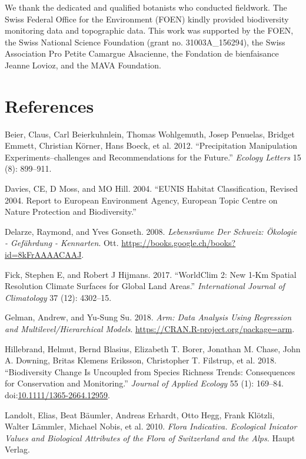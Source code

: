 \documentclass[fleqn,10pt,lineno]{wlpeerj} %
\theoremstyle{definition}
\theoremstyle{definition}
\theoremstyle{definition}
\theoremstyle{remark}
\begin{document}
We thank the dedicated and qualified botanists who conducted fieldwork.
The Swiss Federal Office for the Environment (FOEN) kindly provided
biodiversity monitoring data and topographic data. This work was
supported by the FOEN, the Swiss National Science Foundation (grant no.
31003A\_156294), the Swiss Association Pro Petite Camargue Alsacienne,
the Fondation de bienfaisance Jeanne Lovioz, and the MAVA Foundation.

\section*{References}\label{references}

\hypertarget{refs}{}
\hypertarget{ref-Beier2012}{}
Beier, Claus, Carl Beierkuhnlein, Thomas Wohlgemuth, Josep Penuelas,
Bridget Emmett, Christian Körner, Hans Boeck, et al. 2012.
``Precipitation Manipulation Experiments--challenges and Recommendations
for the Future.'' \emph{Ecology Letters} 15 (8): 899--911.

\hypertarget{ref-Davies2004}{}
Davies, CE, D Moss, and MO Hill. 2004. ``EUNIS Habitat Classification,
Revised 2004. Report to European Environment Agency, European Topic
Centre on Nature Protection and Biodiversity.''

\hypertarget{ref-Delarze2008}{}
Delarze, Raymond, and Yves Gonseth. 2008. \emph{Lebensräume Der Schweiz:
Ökologie - Gefährdung - Kennarten}. Ott.
\url{https://books.google.ch/books?id=8kFrAAAACAAJ}.

\hypertarget{ref-Fick2017}{}
Fick, Stephen E, and Robert J Hijmans. 2017. ``WorldClim 2: New 1-Km
Spatial Resolution Climate Surfaces for Global Land Areas.''
\emph{International Journal of Climatology} 37 (12): 4302--15.

\hypertarget{ref-arm2018}{}
Gelman, Andrew, and Yu-Sung Su. 2018. \emph{Arm: Data Analysis Using
Regression and Multilevel/Hierarchical Models}.
\url{https://CRAN.R-project.org/package=arm}.

\hypertarget{ref-Hillebrand2018}{}
Hillebrand, Helmut, Bernd Blasius, Elizabeth T. Borer, Jonathan M.
Chase, John A. Downing, Britas Klemens Eriksson, Christopher T.
Filstrup, et al. 2018. ``Biodiversity Change Is Uncoupled from Species
Richness Trends: Consequences for Conservation and Monitoring.''
\emph{Journal of Applied Ecology} 55 (1): 169--84.
doi:\href{https://doi.org/10.1111/1365-2664.12959}{10.1111/1365-2664.12959}.

\hypertarget{ref-Landolt2010}{}
Landolt, Elias, Beat Bäumler, Andreas Erhardt, Otto Hegg, Frank Klötzli,
Walter Lämmler, Michael Nobis, et al. 2010. \emph{Flora Indicativa.
Ecological Inicator Values and Biological Attributes of the Flora of
Switzerland and the Alps.} Haupt Verlag.
\end{document}
